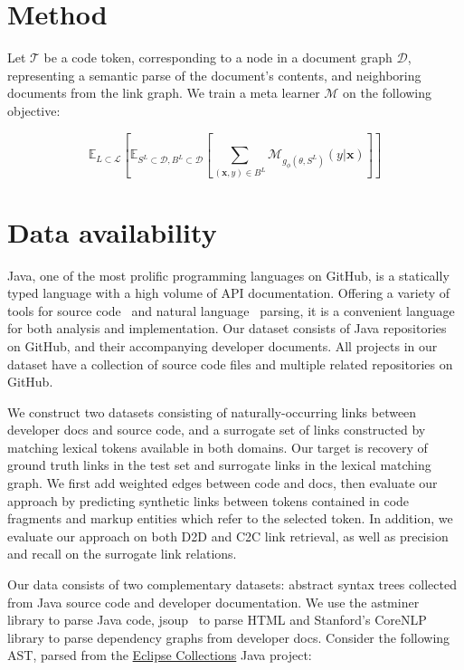 \documentclass{article}
\begin{document}
\section{Method}

Let $\mathcal T$ be a code token, corresponding to a node in a document graph $\mathcal D$, representing a semantic parse of the document's contents, and neighboring documents from the link graph. We train a meta learner $\mathcal M$ on the following objective:

\begin{equation}
    \mathbb{E}_{L\subset\mathcal{L}}[ \mathbb{E}_{S^L \subset\mathcal{D}, B^L \subset\mathcal{D}} [\sum_{(\mathbf{x}, y)\in B^L} \mathcal M_{g_\phi(\theta, S^L)}(y \vert \mathbf{x})]]
\end{equation}

\section{Data availability}

Java, one of the most prolific programming languages on GitHub, is a statically typed language with a high volume of API documentation. Offering a variety of tools for source code~\citep{parr2013definitive, hosseini2013javaparser, kovalenko2019pathminer} and natural language~\citep{manning2014stanford, grella2018non} parsing, it is a convenient language for both analysis and implementation. Our dataset consists of Java repositories on GitHub, and their accompanying developer documents. All projects in our dataset have a collection of source code files and multiple related repositories on GitHub.

We construct two datasets consisting of naturally-occurring links between developer docs and source code, and a surrogate set of links constructed by matching lexical tokens available in both domains. Our target is recovery of ground truth links in the test set and surrogate links in the lexical matching graph. We first add weighted edges between code and docs, then evaluate our approach by predicting synthetic links between tokens contained in code fragments and markup entities which refer to the selected token. In addition, we evaluate our approach on both D2D and C2C link retrieval, as well as precision and recall on the surrogate link relations.

Our data consists of two complementary datasets: abstract syntax trees collected from Java source code and developer documentation. We use the astminer~\citep{kovalenko2019pathminer} library to parse Java code, jsoup~\citep{hedley2009jsoup} to parse HTML and Stanford's CoreNLP~\citep{manning2014stanford} library to parse dependency graphs from developer docs. Consider the following AST, parsed from the \href{https://www.eclipse.org/collections/}{Eclipse Collections} Java project:
\end{document}
